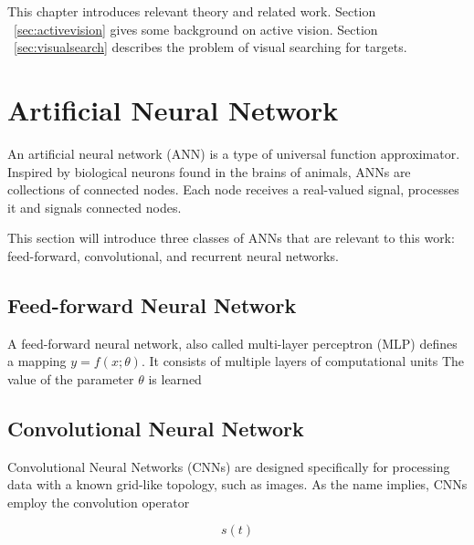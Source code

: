 This chapter introduces relevant theory and related work.
Section ~\ref{sec:activevision} gives some background on active vision.
Section ~\ref{sec:visualsearch} describes the problem of visual searching for targets.



\section{Artificial Neural Network}

An artificial neural network (ANN) is a type of universal function approximator.
Inspired by biological neurons found in the brains of animals, ANNs are collections of connected nodes.
Each node receives a real-valued signal, processes it and signals connected nodes.


This section will introduce three classes of ANNs that are relevant to this work:
feed-forward, convolutional, and recurrent neural networks.

\subsection{Feed-forward Neural Network}

A feed-forward neural network, also called multi-layer perceptron (MLP) defines a mapping \(y = f(x; \theta)\).
It consists of multiple layers of computational units
The value of the parameter \(\theta\) is learned  

\cite{goodfellow_deep_2016}

\subsection{Convolutional Neural Network}

Convolutional Neural Networks (CNNs) are designed specifically for processing data with a known grid-like topology, such as images.
As the name implies, CNNs employ the convolution operator

\[
    s(t) 
\]

\cite{goodfellow_deep_2016}


